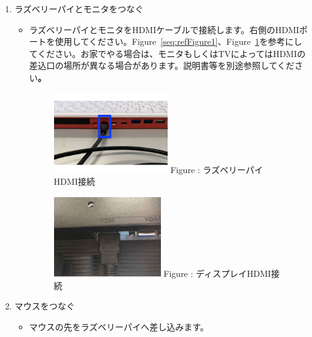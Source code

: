 \documentclass[a4paper,12pt]{jarticle}
\begin{document}
\begin{enumerate}
  \item ラズベリーパイとモニタをつなぐ

        \begin{itemize}
          \item
                ラズベリーパイとモニタをHDMIケーブルで接続します。右側のHDMIポートを使用してください。Figure~\ref{seq:refFigure1}、Figure~\ref{seq:refFigure2}を参考にしてください。お家でやる場合は、モニタもしくはTVによってはHDMIの差込口の場所が異なる場合があります。説明書等を別途参照してください\textbf{。}


                \begin{figure}[h]
                  \begin{minipage}{0.5\textwidth}
                    {\upshape
                      \includegraphics[height=3.471cm]{figure222023.pdf}
                      \newline
                      Figure {\theFigure\label{seq:refFigure1}}:
                      ラズベリーパイHDMI接続}
                  \end{minipage}
                  \begin{minipage}{0.5\textwidth}
                    {\upshape
                      \includegraphics[height=3.471cm]{textbook-img016.png}
                      \newline
                      Figure {\theFigure\label{seq:refFigure2}}:
                      ディスプレイHDMI接続}
                  \end{minipage}
                \end{figure}

        \end{itemize}
  \item マウスをつなぐ

        \begin{itemize}
          \item
                マウスの先をラズベリーパイへ差し込みます。
        \end{itemize}
\end{enumerate}
\end{document}
